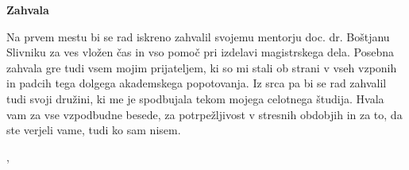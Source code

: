 \thispagestyle{empty}

\begin{center}
{\Large \textbf{\sc Zahvala}}
\end{center}
\vspace{0.5cm}

{\it\noindent

Na prvem mestu bi se rad iskreno zahvalil svojemu mentorju doc. dr. Boštjanu Slivniku za ves vložen čas in vso pomoč pri izdelavi magistrskega dela. Posebna zahvala gre tudi vsem mojim prijateljem, ki so mi stali ob strani v vseh vzponih in padcih tega dolgega akademskega popotovanja. Iz srca pa bi se rad zahvalil tudi svoji družini, ki me je spodbujala tekom mojega celotnega študija. Hvala vam za vse vzpodbudne besede, za potrpežljivost v stresnih obdobjih in za to, da ste verjeli vame, tudi ko sam nisem. 




\vspace{0.5cm} \hfill \tauthor, \myyear
}